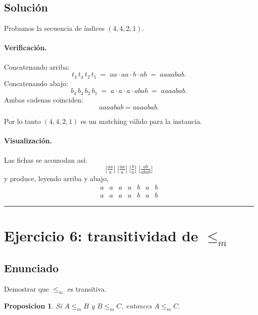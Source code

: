 \documentclass[11pt,a4paper]{article}
\theoremstyle{plain}
\newtheorem{proposicion}[teorema]{Proposicion}
\theoremstyle{definition}
\theoremstyle{remark}
\newcommand{\redm}{\le_{m}}
\begin{document}
\subsection*{Soluci\'on}

Probamos la secuencia de \'indices $(4,4,2,1)$.

\paragraph{Verificaci\'on.} Concatenando arriba:
\[
  t_4\, t_4\, t_2\, t_1 \;=\; aa\cdot aa \cdot b \cdot ab \;=\; aaaabab.
\]
Concatenando abajo:
\[
  b_4\, b_4\, b_2\, b_1 \;=\; a\cdot a \cdot a \cdot abab \;=\; aaaabab.
\]
Ambas cadenas coinciden:
\[
  aaaabab = aaaabab.
\]

Por lo tanto $(4,4,2,1)$ es un matching v\'alido para la instancia.

\paragraph{Visualizaci\'on.} Las fichas se acomodan as\'i:
\[
  \Big[\tfrac{aa}{a}\Big]\;\Big[\tfrac{aa}{a}\Big]\;\Big[\tfrac{b}{a}\Big]\;\Big[\tfrac{ab}{abab}\Big]
\]
y produce, leyendo arriba y abajo,
\[
  \begin{array}{c|c|c|c|c|c|c}
    a & a & a & a & b & a & b\\
    \hline
    a & a & a & a & b & a & b
  \end{array}
\]

\begin{center}\end{center}

\bigskip\hrule\bigskip

\section{Ejercicio 6: transitividad de $\redm$}
\label{sec:ej6}

\subsection*{Enunciado}

Demostrar que $\redm$ es transitiva.

\begin{proposicion}
\label{prop:transit}
Si $A\redm B$ y $B\redm C$, entonces $A\redm C$.
\end{proposicion}
\end{document}
